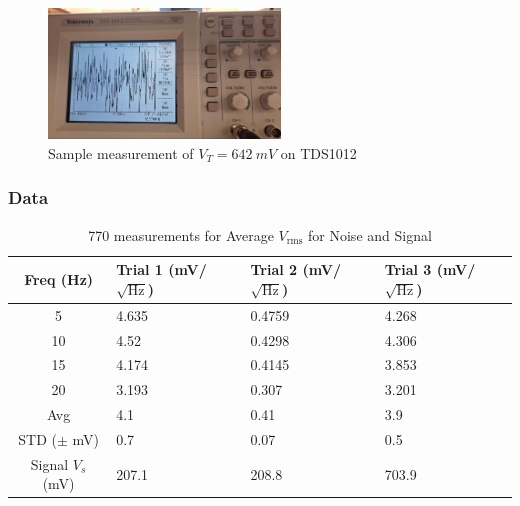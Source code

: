 \documentclass[../main.tex]{subfiles}
\begin{document}
\begin{figure}[ht]
    \centering
    \includegraphics[width=0.55\textwidth]{fig1_11.jpg}
    \caption{Sample measurement of $V_T = \qty{642}{mV}$ on TDS1012}
    \label{fig:1.11}
\end{figure}

\newpage
\subsubsection*{Data}

\begin{table}[!ht]
    \centering
    \begin{tabular}{|c|l|l|l|}
    \hline
        Freq (Hz) & Trial 1 (mV/$\sqrt{\text{Hz}}$) & Trial 2 (mV/$\sqrt{\text{Hz}}$) & Trial 3 (mV/$\sqrt{\text{Hz}}$) \\ \hline
        5 & 4.635 & 0.4759 & 4.268 \\ \hline
        10 & 4.52 & 0.4298 & 4.306 \\ \hline
        15 & 4.174 & 0.4145 & 3.853 \\ \hline
        20 & 3.193 & 0.307 & 3.201 \\ \hline
        Avg & 4.1 & 0.41 & 3.9 \\ \hline
        STD ($\pm$ mV) & 0.7 & 0.07 & 0.5 \\ \hline
        Signal $V_s$ (mV) & 207.1 & 208.8 & 703.9 \\ \hline
    \end{tabular}
    \caption{770 measurements for Average $V_\text{rms}$ for Noise and Signal}
    \label{tab:1}
\end{table}
\end{document}
